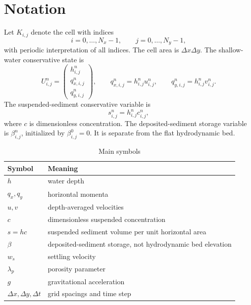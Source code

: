 \section{Notation}

Let \(K_{i,j}\) denote the cell with indices
\[
  i=0,\ldots,N_x-1,\qquad j=0,\ldots,N_y-1,
\]
with periodic interpretation of all indices. The cell area is \(\Delta x\Delta y\). The shallow-water conservative state is
\[
  U_{i,j}^n =
  \begin{pmatrix}
  h_{i,j}^n\\ q_{x,i,j}^n\\ q_{y,i,j}^n
  \end{pmatrix},
  \qquad
  q_{x,i,j}^n=h_{i,j}^n u_{i,j}^n,\qquad
  q_{y,i,j}^n=h_{i,j}^n v_{i,j}^n .
\]
The suspended-sediment conservative variable is
\[
  s_{i,j}^n = h_{i,j}^n c_{i,j}^n,
\]
where \(c\) is dimensionless concentration. The deposited-sediment storage variable is \(\beta_{i,j}^n\), initialized by \(\beta_{i,j}^0=0\). It is separate from the flat hydrodynamic bed.

\begin{table}[H]
\centering
\caption{Main symbols}
\begin{tabular}{ll}
\toprule
Symbol & Meaning \\
\midrule
\(h\) & water depth \\
\(q_x,q_y\) & horizontal momenta \\
\(u,v\) & depth-averaged velocities \\
\(c\) & dimensionless suspended concentration \\
\(s=hc\) & suspended sediment volume per unit horizontal area \\
\(\beta\) & deposited-sediment storage, not hydrodynamic bed elevation \\
\(w_s\) & settling velocity \\
\(\lambda_p\) & porosity parameter \\
\(g\) & gravitational acceleration \\
\(\Delta x,\Delta y,\Delta t\) & grid spacings and time step \\
\bottomrule
\end{tabular}
\end{table}
